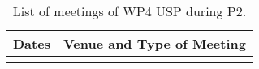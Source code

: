 \begin{table}[H]
\caption{List of meetings of WP4 USP during P2.}
\centering
\begin{tabular}{|L{0.2\textwidth}|C{0.8\textwidth}|} \hline
    {\bf Dates} & {\bf Venue and Type of Meeting} \\ \hline
     & \\ \hline 
\end{tabular}
\label{tab:usp-wp4-meet}
\end{table}